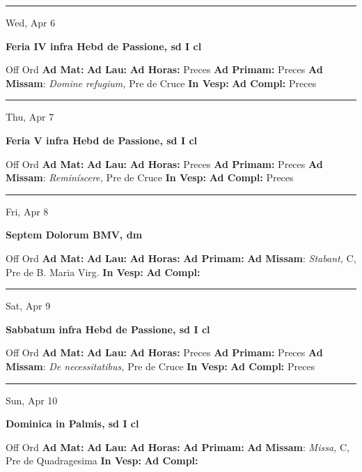 \documentclass[letterpaper, 10pt]{article}
\begin{document}
\hrule
\begin{center}
Wed, Apr 6
\end{center}\textbf{ \large Feria IV infra Hebd de Passione, \textnormal{\normalsize sd I cl}}
\begin{justify}
Off Ord
\textbf{Ad Mat: }
\textbf{Ad Lau: }
\textbf{Ad Horas: }Preces
\textbf{Ad Primam: }Preces
\textbf{Ad Missam}: \textit{Domine refugium,} Pre de Cruce
\textbf{In Vesp: }
\textbf{Ad Compl: }Preces\end{justify}



\hrule
\begin{center}
Thu, Apr 7
\end{center}\textbf{ \large Feria V infra Hebd de Passione, \textnormal{\normalsize sd I cl}}
\begin{justify}
Off Ord
\textbf{Ad Mat: }
\textbf{Ad Lau: }
\textbf{Ad Horas: }Preces
\textbf{Ad Primam: }Preces
\textbf{Ad Missam}: \textit{Reminíscere,} Pre de Cruce
\textbf{In Vesp: }
\textbf{Ad Compl: }Preces\end{justify}



\hrule
\begin{center}
Fri, Apr 8
\end{center}\textbf{ \large Septem Dolorum BMV, \textnormal{\normalsize dm}}
\begin{justify}
Off Ord
\textbf{Ad Mat: }
\textbf{Ad Lau: }
\textbf{Ad Horas: }
\textbf{Ad Primam: }
\textbf{Ad Missam}: \textit{Stabant,} C, Pre de B. Maria Virg.
\textbf{In Vesp: }
\textbf{Ad Compl: }\end{justify}



\hrule
\begin{center}
Sat, Apr 9
\end{center}\textbf{ \large Sabbatum infra Hebd de Passione, \textnormal{\normalsize sd I cl}}
\begin{justify}
Off Ord
\textbf{Ad Mat: }
\textbf{Ad Lau: }
\textbf{Ad Horas: }Preces
\textbf{Ad Primam: }Preces
\textbf{Ad Missam}: \textit{De necessitatibus,} Pre de Cruce
\textbf{In Vesp: }
\textbf{Ad Compl: }Preces\end{justify}



\hrule
\begin{center}
Sun, Apr 10
\end{center}\textbf{ \large Dominica in Palmis, \textnormal{\normalsize sd I cl}}
\begin{justify}
Off Ord
\textbf{Ad Mat: }
\textbf{Ad Lau: }
\textbf{Ad Horas: }
\textbf{Ad Primam: }
\textbf{Ad Missam}: \textit{Missa,} C, Pre de Quadragesima
\textbf{In Vesp: }
\textbf{Ad Compl: }\end{justify}
\end{document}
